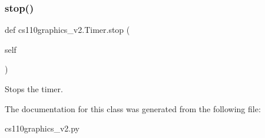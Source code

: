 \subsubsection{\texorpdfstring{stop()}{stop()}}
{\footnotesize\ttfamily def cs110graphics\+\_\+v2.\+Timer.\+stop (\begin{DoxyParamCaption}\item[{}]{self }\end{DoxyParamCaption})}



Stops the timer. 



The documentation for this class was generated from the following file\+:\begin{DoxyCompactItemize}
\item 
cs110graphics\+\_\+v2.\+py\end{DoxyCompactItemize}
